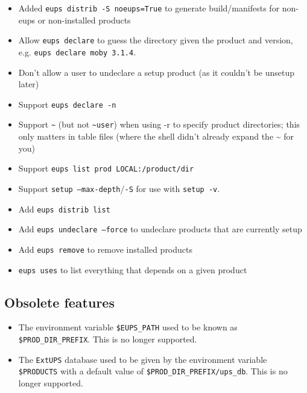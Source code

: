 \documentclass{article}
\newcommand{\code}[1]{\texttt{#1}}
\newcommand{\eups}{\code{ExtUPS}\xspace}
\begin{document}
\begin{itemize}
  \item
    Added \code{eups distrib -S noeups=True} to generate build/manifests for non-eups or non-installed products

  \item
    Allow \code{eups declare} to guess the directory given the product and version,
    e.g. \code{eups declare moby 3.1.4}.

  \item
    Don't allow a user to undeclare a setup product (as it couldn't be unsetup later)

  \item
    Support \code{eups declare -n}

  \item
    Support \code{\~} (but not \code{\~{}user}) when using -r to specify product directories;
    this only matters in table files (where the shell didn't already expand
    the \~{} for you)

  \item
    Support \code{eups list prod LOCAL:/product/dir}

  \item
    Support \code{setup --max-depth}/\code{-S} for use with \code{setup -v}.

  \item
    Add \code{eups distrib list}

  \item
    Add \code{eups undeclare --force} to undeclare products that are currently
    setup

  \item
    Add \code{eups remove} to remove installed products

  \item \code{eups uses} to list everything that depends on a given product
    
\end{itemize}

\subsection{Obsolete features}

\begin{itemize}
  \item The environment variable \code{\$EUPS\_PATH} used to be known
  as \code{\$PROD\_DIR\_PREFIX}. This is no longer supported.

  \item The \eups database used to be given by the environment variable \code{\$PRODUCTS}
    with a default value of \code{\$PROD\_DIR\_PREFIX/ups\_db}. This is no longer supported.
\end{itemize}
\end{document}

